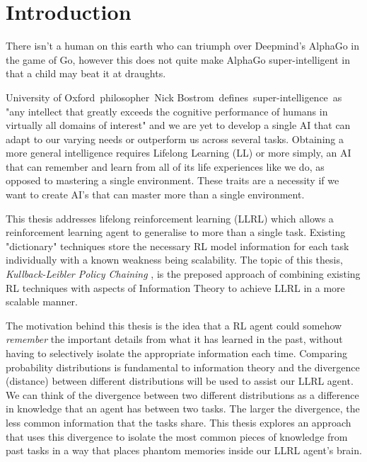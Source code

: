\chapter{Introduction}

There isn’t a human on this earth who can triumph over Deepmind’s AlphaGo in the game of Go, however this does not quite make AlphaGo super-intelligent in that a child may beat it at draughts. 

University of Oxford philosopher Nick Bostrom defines super-intelligence as "any intellect that greatly exceeds the cognitive performance of humans in virtually all domains of interest" and we are yet to develop a single AI that can adapt to our varying needs or outperform us across several tasks. Obtaining a more general intelligence requires Lifelong Learning (LL) or more simply, an AI that can remember and learn from all of its life experiences like we do, as opposed to mastering a single environment. These traits are a necessity if we want to create AI's that can master more than a single environment. 

This thesis addresses lifelong reinforcement learning (LLRL) which allows a reinforcement learning agent to generalise to more than a single task. Existing "dictionary" techniques store the necessary RL model information for each task individually with a known weakness being scalability. The topic of this thesis, \textit{Kullback-Leibler Policy Chaining} , is the preposed approach of combining existing RL techniques with aspects of Information Theory to achieve LLRL in a more scalable manner. 

The motivation behind this thesis is the idea that a RL agent could somehow \textit{remember} the important details from what it has learned in the past, without having to selectively isolate the appropriate information each time. Comparing probability distributions is fundamental to information theory and the divergence (distance) between different distributions will be used to assist our LLRL agent. We can think of the divergence between two different distributions as a difference in knowledge that an agent has between two tasks. The larger the divergence, the less common information that the tasks share. This thesis explores an approach that uses this divergence to isolate the most common pieces of knowledge from past tasks in a way that places phantom memories inside our LLRL agent's brain. 

